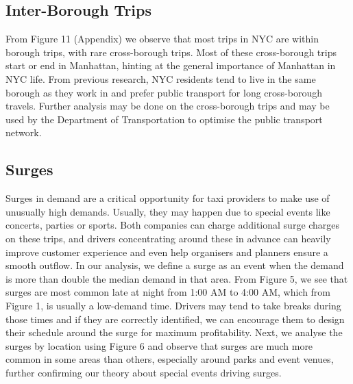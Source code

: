 \documentclass[11pt]{article}
\begin{document}
\subsection{Inter-Borough Trips}
From Figure 11 (Appendix) we observe that most trips in NYC are within borough trips, with rare cross-borough trips. Most of these cross-borough trips start or end in Manhattan, hinting at the general importance of  Manhattan in NYC life. From previous research, NYC residents tend to live in the same borough as they work in and prefer public transport for long cross-borough travels\cite{communingpdf}. Further analysis may be done on the cross-borough trips and may be used by the Department of Transportation to optimise the public transport network.

\subsection{Surges}
Surges in demand are a critical opportunity for taxi providers to make use of unusually high demands. Usually, they may happen due to special events like concerts, parties or sports. Both companies can charge additional surge charges on these trips, and drivers concentrating around these in advance can heavily improve customer experience and even help organisers and planners ensure a smooth outflow\cite{uberpricing, lyftpricing}. In our analysis, we define a surge as an event when the demand is more than double the median demand in that area. From Figure 5, we see that surges are most common late at night from 1:00 AM to 4:00 AM, which from Figure 1, is usually a low-demand time. Drivers may tend to take breaks during those times and if they are correctly identified, we can encourage them to design their schedule around the surge for maximum profitability. Next, we analyse the surges by location using Figure 6 and observe that surges are much more common in some areas than others, especially around parks and event venues, further confirming our theory about special events driving surges.
\end{document}
